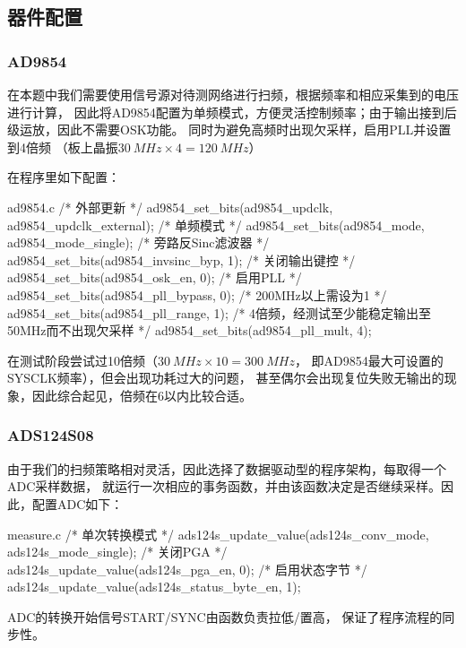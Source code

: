 \subsection{器件配置}
\subsubsection{AD9854}
在本题中我们需要使用信号源对待测网络进行扫频，根据频率和相应采集到的电压进行计算，
因此将AD9854配置为单频模式，方便灵活控制频率；由于输出接到后级运放，因此不需要OSK功能。
同时为避免高频时出现欠采样，启用PLL并设置到4倍频
（板上晶振$\SI{30}{MHz}\times 4 = \SI{120}{MHz}$）

在程序里如下配置：

\begin{cbox}{ad9854.c}
  /* 外部更新 */
  ad9854_set_bits(ad9854_updclk, ad9854_updclk_external);
  /* 单频模式 */
  ad9854_set_bits(ad9854_mode, ad9854_mode_single);
  /* 旁路反Sinc滤波器 */
  ad9854_set_bits(ad9854_invsinc_byp, 1);
  /* 关闭输出键控 */
  ad9854_set_bits(ad9854_osk_en, 0);
  /* 启用PLL */
  ad9854_set_bits(ad9854_pll_bypass, 0);
  /* 200MHz以上需设为1 */
  ad9854_set_bits(ad9854_pll_range, 1);
  /* 4倍频，经测试至少能稳定输出至50MHz而不出现欠采样 */
  ad9854_set_bits(ad9854_pll_mult, 4);
\end{cbox}

在测试阶段尝试过10倍频（$\SI{30}{MHz}\times 10 = \SI{300}{MHz}$，
即AD9854最大可设置的SYSCLK频率），但会出现功耗过大的问题，
甚至偶尔会出现复位失败无输出的现象，因此综合起见，倍频在6以内比较合适。

\subsubsection{ADS124S08}
由于我们的扫频策略相对灵活，因此选择了数据驱动型的程序架构，每取得一个ADC采样数据，
就运行一次相应的事务函数，并由该函数决定是否继续采样。因此，配置ADC如下：

\begin{cbox}{measure.c}
  /* 单次转换模式 */
  ads124s_update_value(ads124s_conv_mode, ads124s_mode_single);
  /* 关闭PGA */
  ads124s_update_value(ads124s_pga_en, 0);
  /* 启用状态字节 */
  ads124s_update_value(ads124s_status_byte_en, 1);
\end{cbox}

ADC的转换开始信号START/SYNC由函数负责拉低/置高，
保证了程序流程的同步性。
